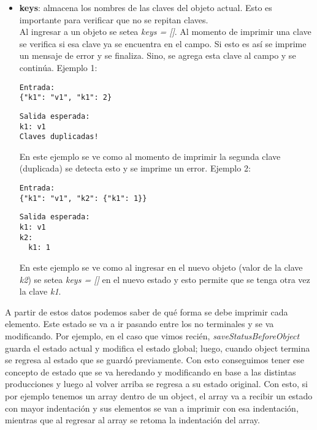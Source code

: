 \begin{itemize}
    \item \textbf{keys}: almacena los nombres de las claves del objeto actual. Esto es importante para verificar que no se repitan claves. \\
    Al ingresar a un objeto se setea \textit{keys = []}. Al momento de imprimir una clave se verifica si esa clave ya se encuentra en el campo. Si esto es así se imprime un mensaje de error y se finaliza. Sino, se agrega esta clave al campo y se continúa.
    Ejemplo 1:
    \begin{verbatim}
Entrada:
{"k1": "v1", "k1": 2}
    \end{verbatim}
    \begin{verbatim}
Salida esperada:
k1: v1
Claves duplicadas!
    \end{verbatim}
    En este ejemplo se ve como al momento de imprimir la segunda clave (duplicada) se detecta esto y se imprime un error.
    Ejemplo 2:
    \begin{verbatim}
Entrada:
{"k1": "v1", "k2": {"k1": 1}}
    \end{verbatim}
    \begin{verbatim}
Salida esperada:
k1: v1
k2:
  k1: 1
    \end{verbatim}
    En este ejemplo se ve como al ingresar en el nuevo objeto (valor de la clave \textit{k2}) se setea \textit{keys = []} en el nuevo estado y esto permite que se tenga otra vez la clave \textit{k1}.
\end{itemize}

A partir de estos datos podemos saber de qué forma se debe imprimir cada elemento. Este estado se va a ir pasando entre los no terminales y se va modificando. Por ejemplo, en el caso que vimos recién, \textit{saveStatusBeforeObject} guarda el estado actual y modifica el estado global; luego, cuando object termina se regresa al estado que se guardó previamente. Con esto conseguimos tener ese concepto de estado que se va heredando y modificando en base a las distintas producciones y luego al volver arriba se regresa a su estado original. Con esto, si por ejemplo tenemos un array dentro de un object, el array va a recibir un estado con mayor indentación y sus elementos se van a imprimir con esa indentación, mientras que al regresar al array se retoma la indentación del array.
